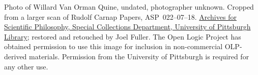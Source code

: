 Photo of Willard Van Orman Quine, undated, photographer
unknown. Cropped from a larger scan of Rudolf Carnap Papers, ASP~022--07--18.
\href{http://www.library.pitt.edu/special-collections}{Archives
for Scientific Philosophy, Special Collections Department, University
of Pittsburgh Library}; restored and retouched by Joel Fuller. The
Open Logic Project has obtained permission to use this image for
inclusion in non-commercial OLP-derived materials. Permission from the
University of Pittsburgh is required for any other use.
